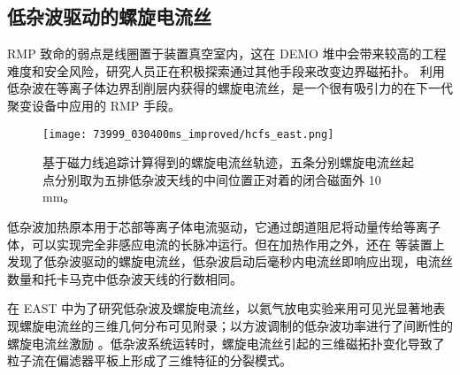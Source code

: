 \subsection{低杂波驱动的螺旋电流丝}
RMP 致命的弱点是线圈置于装置真空室内，这在 DEMO 堆中会带来较高的工程难度和安全风险，研究人员正在积极探索通过其他手段来改变边界磁拓扑。 利用低杂波在等离子体边界刮削层内获得的螺旋电流丝，是一个很有吸引力的在下一代聚变设备中应用的 RMP 手段。


\begin{figure}[t]
  \centering
  \texttt{[image: 73999\_030400ms\_improved/hcfs\_east.png]}
  \caption{基于磁力线追踪计算得到的螺旋电流丝轨迹，五条分别螺旋电流丝起点分别取为五排低杂波天线的中间位置正对着的闭合磁面外 10 mm。}
\end{figure}

低杂波加热原本用于芯部等离子体电流驱动，它通过朗道阻尼将动量传给等离子体，可以实现完全非感应电流的长脉冲\Hmode 运行。但在加热作用之外，还在 \east 等装置上发现了低杂波驱动的螺旋电流丝，低杂波启动后毫秒内电流丝即响应出现，电流丝数量和托卡马克中低杂波天线的行数相同。


在 EAST 中为了研究低杂波及螺旋电流丝，以氦气放电实验来用可见光显著地表现螺旋电流丝的三维几何分布可见附录；以方波调制的低杂波功率进行了间断性的螺旋电流丝激励 。低杂波系统运转时，螺旋电流丝引起的三维磁拓扑变化导致了粒子流在偏滤器平板上形成了三维特征的分裂模式\cite{the_east_team_magnetic_2013}。






